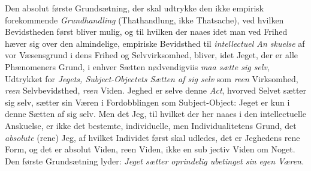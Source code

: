 \documentclass[12pt,a4paper]{book}
\begin{document}
Den absolut første Grundsætning, der skal udtrykke den
ikke empirisk forekommende \emph{Grundhandling} (Thathandlung,
ikke Thatsache), ved hvilken Bevidstheden først bliver mulig,
og til hvilken der naaes idet man ved Frihed hæver sig over
den almindelige, empiriske Bevidsthed til \emph{intellectuel An\-%
skuelse} af vor Væsensgrund i dens Frihed og Selvvirksomhed,
bliver, idet Jeget, der er alle Phænomeners Grund, i enhver
Sætten nødvendigviis \emph{maa sætte sig selv}, Udtrykket for
\emph{Jegets, Subject-Objectets Sætten af sig selv} som
\emph{reen} Virksomhed, \emph{reen} Selvbevidsthed, \emph{reen} Viden. Jeghed
er selve denne \emph{Act}, hvorved Selvet sætter sig selv, sætter sin
Væren i Fordobblingen som Subject-Object: Jeget er kun i
denne Sætten af sig selv. Men det Jeg, til hvilket der her
naaes i den intellectuelle Anskuelse, er ikke det bestemte,
individuelle, men Individualitetens Grund, det \emph{absolute} (rene)
Jeg, af hvilket Individet først skal udledes, det er Jeghedens
rene Form, og det er absolut Viden, reen Viden, ikke en sub\-%
jectiv Viden om Noget. Den første Grundsætning lyder:
\emph{Jeget sætter oprindelig ubetinget sin egen Væren.}
\end{document}
